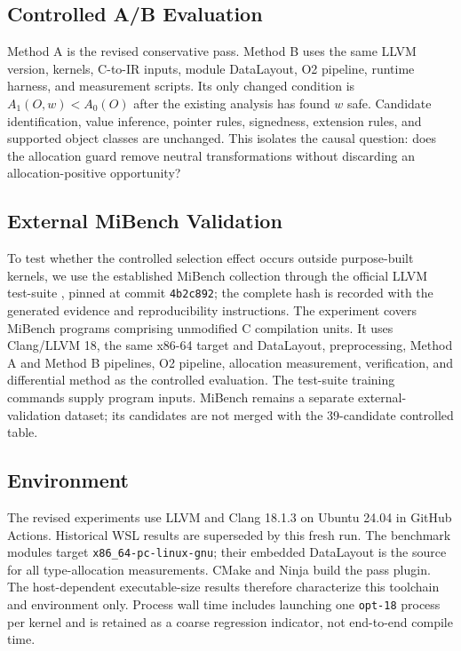 \documentclass[11pt,twocolumn]{article}
\begin{document}


\subsection{Controlled A/B Evaluation}

Method A is the revised conservative pass. Method B uses the same LLVM version,
\BenchmarkCount{} kernels, C-to-IR inputs, module DataLayout, O2 pipeline,
runtime harness, and measurement scripts. Its only changed condition is
$A_1(O,w)<A_0(O)$ after the existing analysis has found $w$ safe. Candidate
identification, value inference, pointer rules, signedness, extension rules, and
supported object classes are unchanged. This isolates the causal question:
does the allocation guard remove neutral transformations without discarding an
allocation-positive opportunity?

\subsection{External MiBench Validation}

To test whether the controlled selection effect occurs outside purpose-built
kernels, we use the established MiBench collection
\citep{guthaus2001mibench} through the official LLVM test-suite
\citep{llvmTestSuite}, pinned at commit
\texttt{4b2c892}; the complete hash is recorded with the generated evidence and
reproducibility instructions. The experiment covers
\ExternalPrograms{} MiBench programs comprising
\ExternalCompilationUnits{} unmodified C compilation units. It uses Clang/LLVM 18,
the same x86-64 target and DataLayout, preprocessing, Method A and Method B
pipelines, O2 pipeline, allocation measurement, verification, and differential method as the
controlled evaluation. The test-suite training commands supply program inputs.
MiBench remains a separate external-validation dataset; its candidates are not
merged with the 39-candidate controlled table.

\subsection{Environment}

The revised experiments use LLVM and Clang 18.1.3 on Ubuntu 24.04 in GitHub
Actions. Historical WSL results are superseded by this fresh run. The
benchmark modules target \texttt{x86\_64-pc-linux-gnu}; their embedded DataLayout
is the source for all type-allocation measurements. CMake and Ninja build the
pass plugin. The host-dependent executable-size results
therefore characterize this toolchain and environment only. Process wall time
includes launching one \texttt{opt-18} process per kernel and is retained as a
coarse regression indicator, not end-to-end compile time.
\end{document}
